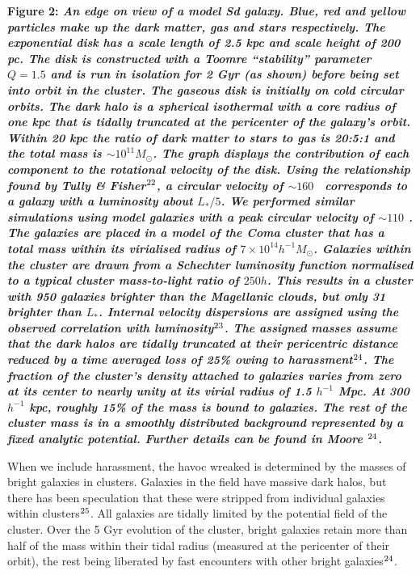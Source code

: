 \oneskip
{\bf Figure 2: \em An edge on view of a model Sd galaxy.  Blue, red
and yellow particles make up the dark matter, gas and stars
respectively. The exponential disk has a scale length of 2.5 kpc and
scale height of 200 pc. The disk is constructed with a Toomre
``stability'' parameter $Q=1.5$ and is run in isolation for 2 Gyr (as
shown) before being set into orbit in the cluster.  The gaseous disk
is initially on cold circular orbits.  The dark halo is a spherical
isothermal with a core radius of one kpc that is tidally truncated at
the pericenter of the galaxy's orbit.  Within 20 kpc the ratio of dark
matter to stars to gas is 20:5:1 and the total mass is $\sim
10^{11}M_\odot$.  The graph displays the contribution of each
component to the rotational velocity of the disk.  Using the
relationship found by Tully \& Fisher$^{\bf\rm 22}$, a circular
velocity of $\sim 160$ \kms \ corresponds to a galaxy with a
luminosity about $L_*/5$. We performed similar simulations using model
galaxies with a peak circular velocity of $\sim 110$ \kms.  The
galaxies are placed in a model of the Coma cluster that has a total
mass within its virialised radius of $7\times10^{14}h^{-1}M_\odot$.
Galaxies within the cluster are  drawn from a
Schechter luminosity function normalised to a typical cluster
mass-to-light ratio of $250 h$.  This results in a cluster with 950
galaxies brighter than the Magellanic clouds, but only 31 brighter
than $L_*$.  Internal velocity dispersions are assigned using the
observed correlation with luminosity$^{\bf\rm 23}$.  The assigned
masses assume that the dark halos are tidally truncated at their
pericentric distance reduced by a time averaged loss of 25\% owing to
harassment$^{\bf\rm 24}$.  The fraction of the cluster's density attached to
galaxies varies from zero at its center to nearly unity at its virial
radius of 1.5 $h^{-1}$ Mpc.  At 300 $h^{-1}$ kpc,
roughly 15\% of the mass is
bound to galaxies.  The rest of the cluster mass is in a smoothly
distributed background represented by a fixed analytic potential.
Further details can be found in Moore \etal$^{\bf\rm 24}$.}
\oneskip


When we include harassment, the havoc wreaked is determined by the
masses of bright galaxies in clusters.  Galaxies in the field have
massive dark halos, but there has been speculation that these were
stripped from individual galaxies within clusters$^{\bf\rm 25}$.  All
galaxies are tidally limited by the potential field of the cluster.
Over the 5 Gyr evolution of the cluster, bright galaxies retain more
than half of the mass within their tidal radius (measured at the
pericenter of their orbit), the rest being liberated by fast
encounters with other bright galaxies$^{\bf\rm 24}$.

